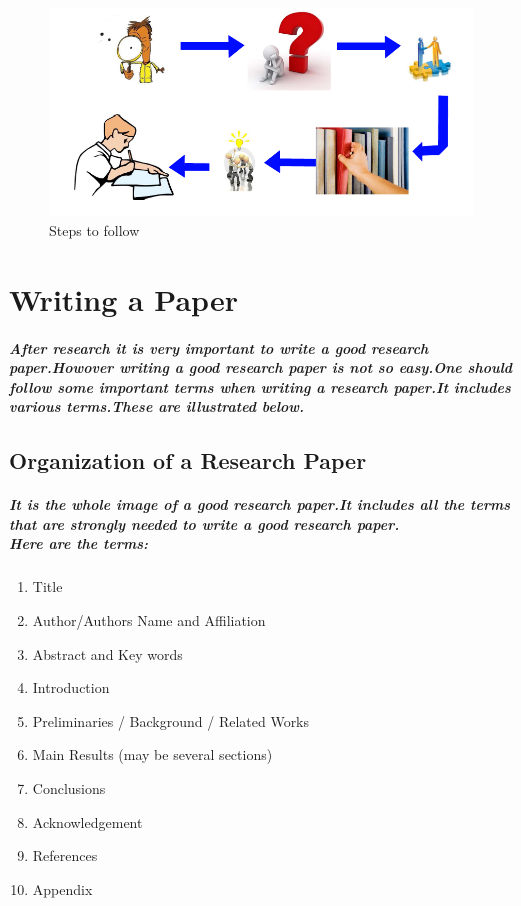 \documentclass[20pt]{report}
\begin{document}
\begin{figure}[!htbp]
\begin{center}
\includegraphics[scale=0.8,natwidth=197,natheight=248]{image.png}%
\caption{Steps to follow}
\label{fig:image}
\end{center}
\end{figure}

  \chapter{Writing a Paper}
 \paragraph{After research it is very important to write a good research paper.Howover writing a good research paper is not so easy.One should follow some important terms when writing a research paper.It includes various terms.These are illustrated below.} 
  \section{Organization of a Research Paper}
  \paragraph{It is the whole image of a good research paper.It includes all the terms that are strongly needed to write a good research paper.\\Here are the terms: }
  \begin{enumerate}
  \item Title
  \item Author/Authors Name and Affiliation
\item Abstract and Key words
\item Introduction
\item Preliminaries / Background / Related Works
\item Main Results (may be several sections)
\item Conclusions
\item Acknowledgement
\item References
\item Appendix
  \end{enumerate}
  
\end{document}

